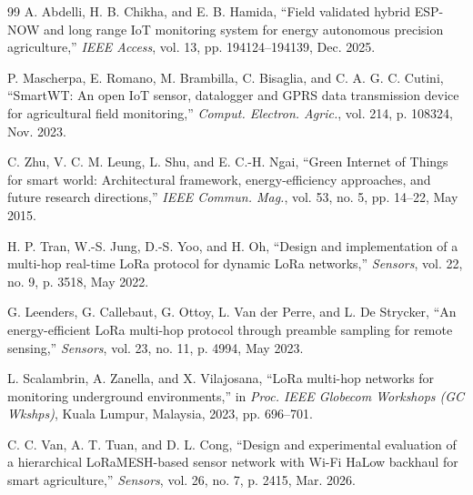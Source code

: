 \documentclass[conference]{IEEEtran}
\begin{document}
\begin{thebibliography}{99}
A. Abdelli, H. B. Chikha, and E. B. Hamida, ``Field validated hybrid ESP-NOW and long range IoT monitoring system for energy autonomous precision agriculture,'' \emph{IEEE Access}, vol. 13, pp. 194124--194139, Dec. 2025.

P. Mascherpa, E. Romano, M. Brambilla, C. Bisaglia, and C. A. G. C. Cutini, ``SmartWT: An open IoT sensor, datalogger and GPRS data transmission device for agricultural field monitoring,'' \emph{Comput. Electron. Agric.}, vol. 214, p. 108324, Nov. 2023.

C. Zhu, V. C. M. Leung, L. Shu, and E. C.-H. Ngai, ``Green Internet of Things for smart world: Architectural framework, energy-efficiency approaches, and future research directions,'' \emph{IEEE Commun. Mag.}, vol. 53, no. 5, pp. 14--22, May 2015.

H. P. Tran, W.-S. Jung, D.-S. Yoo, and H. Oh, ``Design and implementation of a multi-hop real-time LoRa protocol for dynamic LoRa networks,'' \emph{Sensors}, vol. 22, no. 9, p. 3518, May 2022.

G. Leenders, G. Callebaut, G. Ottoy, L. Van der Perre, and L. De Strycker, ``An energy-efficient LoRa multi-hop protocol through preamble sampling for remote sensing,'' \emph{Sensors}, vol. 23, no. 11, p. 4994, May 2023.

L. Scalambrin, A. Zanella, and X. Vilajosana, ``LoRa multi-hop networks for monitoring underground environments,'' in \emph{Proc. IEEE Globecom Workshops (GC Wkshps)}, Kuala Lumpur, Malaysia, 2023, pp. 696--701.

C. C. Van, A. T. Tuan, and D. L. Cong, ``Design and experimental evaluation of a hierarchical LoRaMESH-based sensor network with Wi-Fi HaLow backhaul for smart agriculture,'' \emph{Sensors}, vol. 26, no. 7, p. 2415, Mar. 2026.

\end{thebibliography}
\end{document}

